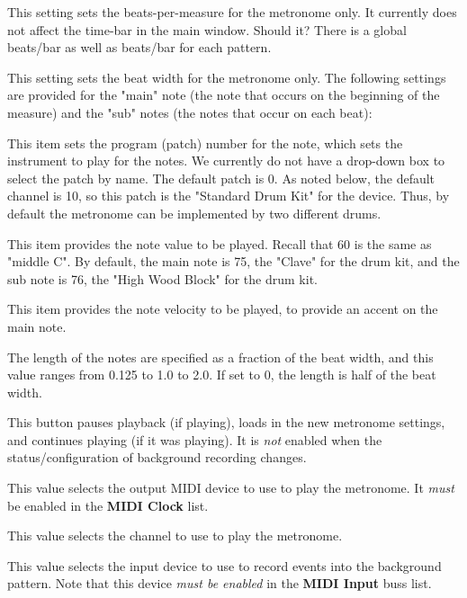    This setting sets the beats-per-measure for the metronome only.
   It currently does not affect the time-bar in the main window.
   Should it? There is a global beats/bar as well as beats/bar for
   each pattern.

   This setting sets the beat width for the metronome only.
   The following settings are provided for the "main" note
   (the note that occurs on the beginning of the measure)
   and the "sub" notes (the notes that occur on each beat):

   This item sets the program (patch) number for the note, which sets the
   instrument to play for the notes.
   We currently do not have a drop-down box to select the patch by name.
   The default patch is 0.
   As noted below, the default channel is 10, so this
   patch is the "Standard Drum Kit" for the device.
   Thus, by default the metronome can be implemented by two different
   drums.

   This item provides the note value to be played.  Recall that 60 is the same
   as "middle C".  By default, the main note is 75, the "Clave" for the drum
   kit, and the sub note is 76, the "High Wood Block" for the drum kit.

   This item provides the note velocity to be played, to provide an accent on
   the main note.

   The length of the notes are specified as a fraction of the beat width, and
   this value ranges from 0.125 to 1.0 to 2.0.
   If set to 0, the length is half of the beat width.

   This button pauses playback (if playing),
   loads in the new metronome settings, and
   continues playing (if it was playing).
   It is \textsl{not} enabled when the status/configuration of background
   recording changes.

   This value selects the output MIDI device to use to play the metronome.
   It \textsl{must} be enabled in the \textbf{MIDI Clock} list.

   This value selects the channel to use to play the metronome.

   This value selects the input device to use to record events into the
   background pattern.
   Note that this device \textsl{must be enabled} in the \textbf{MIDI Input}
   buss list.

